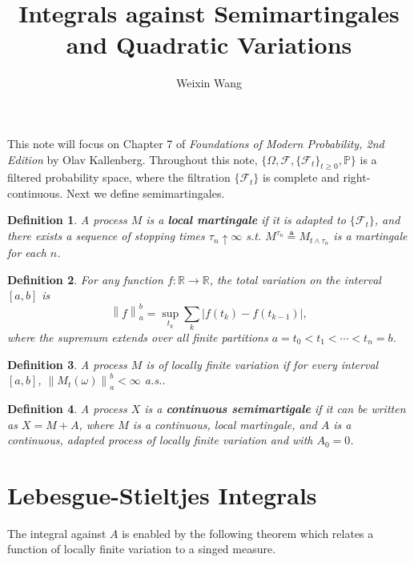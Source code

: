 \documentclass[10pt,twocolumn]{article}
\title{\textbf{Integrals against Semimartingales and Quadratic Variations}}
\author{Weixin Wang}
\date{}
\newtheorem{definition}{Definition}
\newcommand{\norm}[1]{\left\lVert#1\right\rVert}
\newcommand{\abs}[1]{\left|#1\right|}
\begin{document}
\maketitle

This note will focus on Chapter 7 of \textit{Foundations of Modern Probability, 2nd Edition} by Olav Kallenberg.
Throughout this note, $\{\Omega, \mathcal{F}, \{\mathcal{F}_t\}_{t\geq0}, \mathbb{P}\}$ is a filtered probability space, where the filtration $\{\mathcal{F}_t\}$ is complete and right-continuous.
Next we define semimartingales.

\begin{definition}
	A process $M$ is a \textbf{local martingale} if it is adapted to $\{\mathcal{F}_t\}$, and there exists a sequence of stopping times $\tau_n \uparrow \infty$ s.t. $M^{\tau_n} \triangleq M_{t \wedge \tau_n}$ is a martingale for each $n$.
\end{definition}

\begin{definition}
	For any function $f:\mathbb{R}\to\mathbb{R}$, the total variation on the interval $[a,b]$ is
	\begin{equation}
	\norm{f}_a^b = \sup_{t_k}\sum_{k} \abs{f(t_k)-f(t_{k-1})},
	\end{equation}
	where the supremum extends over all finite partitions $a=t_0 < t_1 < \cdots < t_n=b$.
\end{definition}

\begin{definition}
	A process $M$ is of locally finite variation if for every interval $[a,b]$, $\norm{M_t(\omega)}_a^b < \infty$ a.s..
\end{definition}

\begin{definition}
	A process $X$ is a \textbf{continuous semimartigale} if it can be written as $X=M+A$, where $M$ is a continuous, local martingale, and $A$ is a continuous, adapted process of locally finite variation and with $A_0=0$. 
\end{definition}


\section{Lebesgue-Stieltjes Integrals}
The integral against $A$ is enabled by the following theorem which relates a function of locally finite variation to a singed measure.
\end{document}
